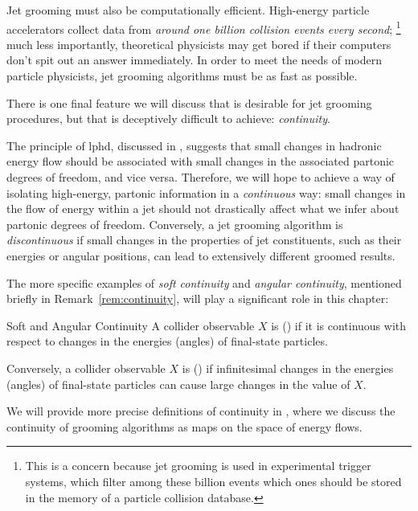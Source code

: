 Jet grooming must also be computationally efficient.
%
High-energy particle accelerators collect data from \textit{around one billion collision events every second};%
\footnote{
    This is a concern because jet grooming is used in experimental trigger systems, which filter among these billion events which ones should be stored in the memory of a particle collision database.
}
%
much less importantly, theoretical physicists may get bored if their computers don't spit out an answer immediately.
%
%
In order to meet the needs of modern particle physicists, jet grooming algorithms must be as fast as possible.


There is one final feature we will discuss that is desirable for jet grooming procedures, but that is deceptively difficult to achieve:
%
\textit{continuity}.


The principle of \gls{lphd}, discussed in , suggests that small changes in hadronic energy flow should be associated with small changes in the associated partonic degrees of freedom, and vice versa.
%
Therefore, we will hope to achieve a way of isolating high-energy, partonic information in a \textit{continuous} way:
%
small changes in the flow of energy within a jet should not drastically affect what we infer about partonic degrees of freedom.
%
Conversely, a jet grooming algorithm is \textit{discontinuous} if small changes in the properties of jet constituents, such as their energies or angular positions, can lead to extensively different groomed results.

The more specific examples of \textit{soft continuity} and \textit{angular continuity}, mentioned briefly in Remark~\ref{rem:continuity}, will play a significant role in this chapter:
\begin{definitionbox}{Soft and Angular Continuity}{}
    A collider observable \(X\) is  () if it is continuous with respect to changes in the energies (angles) of final-state particles.

    Conversely, a collider observable \(X\) is  () if infinitesimal changes in the energies (angles) of final-state particles can cause large changes in the value of \(X\).
\end{definitionbox}
\noindent
We will provide more precise definitions of continuity in , where we discuss the continuity of grooming algorithms as maps on the space of energy flows.


